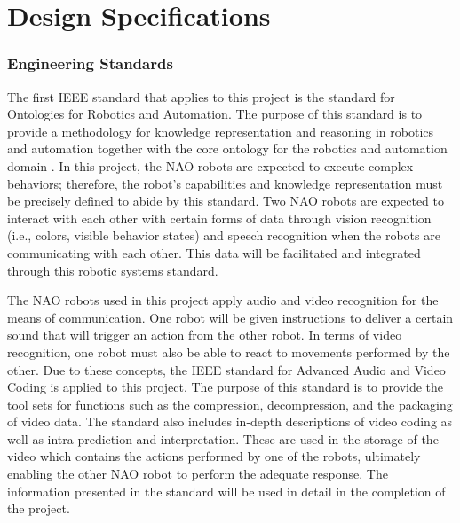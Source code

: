 \chapter{Design Specifications}
\label{ch:designspecifications}



\newpage

\subsection{Engineering Standards}

The first IEEE standard that applies to this project is the standard for Ontologies for Robotics and Automation. The purpose of this standard is to provide a methodology for knowledge representation and reasoning in robotics and automation together with the core ontology for the robotics and automation domain \cite{7084073}. In this project, the NAO robots are expected to execute complex behaviors; therefore, the robot’s capabilities and knowledge representation must be precisely defined to abide by this standard. Two NAO robots are expected to interact with each other with certain forms of data through vision recognition (i.e., colors, visible behavior states) and speech recognition when the robots are communicating with each other. This data will be facilitated and integrated through this robotic systems standard.\par

The NAO robots used in this project apply audio and video recognition for the means of communication. One robot will be given instructions to deliver a certain sound that will trigger an action from the other robot. In terms of video recognition, one robot must also be able to react to movements performed by the other. Due to these concepts, the IEEE standard for Advanced Audio and Video Coding is applied to this project. The purpose of this standard is to provide the tool sets for functions such as the compression, decompression, and the packaging of video data. The standard also includes in-depth descriptions of video coding as well as intra prediction and interpretation. These are used in the storage of the video which contains the actions performed by one of the robots, ultimately enabling the other NAO robot to perform the adequate response. The information presented in the standard will be used in detail in the completion of the project. \cite{6522104} \par 

